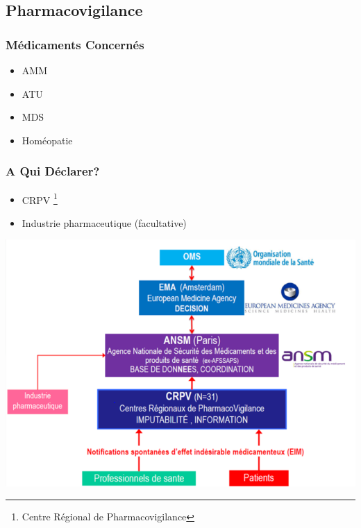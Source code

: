 \documentclass[11pt]{article}
\begin{document}
\subsection{Pharmacovigilance}
\label{sec:org1df5e75}
\subsubsection{Médicaments Concernés}
\label{sec:orgf0987ca}
\begin{itemize}
\item AMM
\item ATU
\item MDS
\item Homéopatie
\end{itemize}
\subsubsection{A Qui Déclarer?}
\label{sec:org51df0ef}
\begin{itemize}
\item CRPV \footnote{Centre Régional de Pharmacovigilance}
\item Industrie pharmaceutique (facultative)
\end{itemize}
\begin{center}
\includegraphics[width=.9\linewidth]{./crpv.png}
\end{center}
\end{document}

